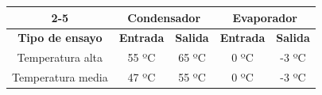 \begin{tabular}{c|cc|cc|}
\cline{2-5}
 & \multicolumn{2}{c|}{\textbf{Condensador}} & \multicolumn{2}{c|}{\textbf{Evaporador}} \\ \hline
\multicolumn{1}{|c|}{\textbf{Tipo de ensayo}} & \multicolumn{1}{c|}{\textbf{Entrada}} & \textbf{Salida} & \multicolumn{1}{c|}{\textbf{Entrada}} & \textbf{Salida} \\ \hline
\multicolumn{1}{|c|}{Temperatura alta} & \multicolumn{1}{c|}{55 ºC} & 65 ºC & \multicolumn{1}{c|}{0 ºC} & -3 ºC \\ \hline
\multicolumn{1}{|c|}{Temperatura media} & \multicolumn{1}{c|}{47 ºC} & 55 ºC & \multicolumn{1}{c|}{0 ºC} & -3 ºC \\ \hline
\end{tabular}